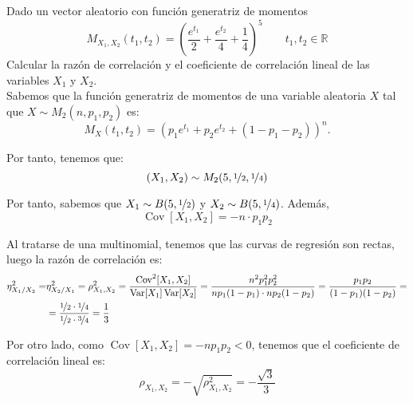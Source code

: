 \documentclass[12pt]{article}
\DeclareMathOperator{\Var}{Var}
\DeclareMathOperator{\Cov}{Cov}
\begin{document}
    \begin{ejercicio}
        Dado un vector aleatorio con función generatriz de momentos
        \begin{equation*}
            M_{X_1,X_2}(t_1,t_2) = {\left(\dfrac{e^{t_1}}{2}+\dfrac{e^{t_2}}{4}+\dfrac{1}{4}\right)}^{5} \qquad t_1,t_2 \in \mathbb{R}
        \end{equation*}
        Calcular la razón de correlación y el coeficiente de correlación lineal de las variables $X_1$ y $X_2$.\\

        Sabemos que la función generatriz de momentos de una variable aleatoria $X$ tal que $X\sim M_2(n,p_1,p_2)$ es:
        \begin{equation*}
            M_X(t_1,t_2) = {\left(p_1e^{t_1}+p_2e^{t_2}+(1-p_1-p_2)\right)}^n.
        \end{equation*}

        Por tanto, tenemos que:
        \begin{equation*}
            (X_1,X_2)\sim M_2(5,\nicefrac{1}{2},\nicefrac{1}{4})
        \end{equation*}

        Por tanto, sabemos que $X_1\sim B(5,\nicefrac{1}{2})$ y $X_2\sim B(5,\nicefrac{1}{4})$. Además,
        $$\Cov[X_1,X_2]=-n\cdot p_1p_2$$

        Al tratarse de una multinomial, tenemos que las curvas de regresión son rectas, luego la razón de correlación es:
        \begin{align*}
            \eta^2_{X_1/X_2}
            =& \eta^2_{X_2/X_1}
            = \rho_{X_1,X_2}^2
            = \dfrac{\Cov^2[X_1,X_2]}{\Var[X_1]\Var[X_2]}
            = \dfrac{n^2p_1^2p_2^2}{np_1(1-p_1)\cdot np_2(1-p_2)}
            = \dfrac{p_1p_2}{(1-p_1)(1-p_2)}
            =\\&= \dfrac{\nicefrac{1}{2}\cdot \nicefrac{1}{4}}{\nicefrac{1}{2}\cdot \nicefrac{3}{4}}
            = \dfrac{1}{3}
        \end{align*}

        Por otro lado, como $\Cov[X_1,X_2]=-np_1p_2<0$, tenemos que el coeficiente de correlación lineal es:
        \begin{equation*}
            \rho_{X_1,X_2} = -\sqrt{\rho_{X_1,X_2}^2}
            = -\dfrac{\sqrt{3}}{3}
        \end{equation*}
    \end{ejercicio}
\end{document}
